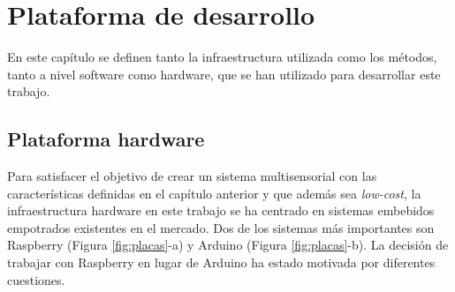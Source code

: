 \chapter{Plataforma de desarrollo}
\label{cap:capitulo3}



\vspace{1cm}

En este capítulo se definen tanto la infraestructura utilizada como los métodos, tanto a nivel software como hardware, que se han utilizado para desarrollar este trabajo.\\

\section{Plataforma hardware}
\label{sec:hw}
Para satisfacer el objetivo de crear un sistema multisensorial con las características definidas en el capítulo anterior y que además sea \textit{low-cost}, la infraestructura hardware en este trabajo se ha centrado en sistemas embebidos empotrados existentes en el mercado. Dos de los sistemas más importantes son Raspberry (Figura \ref{fig:placas}-a) y Arduino (Figura \ref{fig:placas}-b). La decisión de trabajar con Raspberry en lugar de Arduino ha estado motivada por diferentes cuestiones.\\

